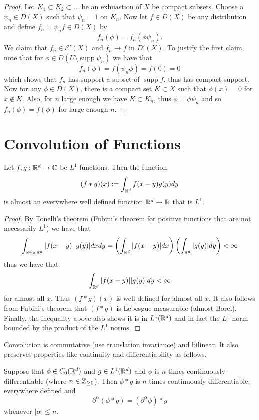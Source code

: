 \documentclass[twoside, a4paper, 10pt]{amsart}
\begin{document}
\begin{proof} Let $K_1 \subset K_2 \subset \ldots $ be an exhuastion of $X$ be compact subsets. Choose a $\psi_n \in D(X)$ such that $\psi_n = 1$ on $K_n$. Now let $f \in D(X)$ be any distribution and define $f_n = \psi_n f \in D(X)$ by $$f_n(\phi) = f_n(\phi \psi_n).$$ We claim that $f_n \in \mathcal{E}'(X)$ and $f_n \to f$ in $D'(X)$. To justify the first claim, note that for $\phi \in D(U \setminus \operatorname{supp} \psi_n)$ we have that $$f_n(\phi) = f(\psi_n \phi) = f(0) = 0$$ which shows that $f_n$ has support a subset of $\operatorname{supp} f$, thus has compact support. Now for any $\phi \in D(X)$, there is a compact set $K \subset X$ such that $\phi(x) = 0$ for $x \notin K$. Also, for $n$ large enough we have $K \subset K_n$, thus $\phi = \phi \psi_n$ and so $f_n(\phi) = f(\phi)$ for large enough $n$. \end{proof}

\section{Convolution of Functions}

\begin{prop} Let $f,g:\mathbb{R}^d \to \mathbb{C}$ be $L^1$ functions. Then the function $$(f * g) (x) := \int_{\mathbb{R}^d} f(x-y)g(y) dy$$ is almost an everywhere well defined function $\mathbb{R}^d \to \mathbb{R}$ that is $L^1$.

\end{prop}

\begin{proof} By Tonelli's theorem (Fubini's theorem for positive functions that are not necessarily $L^1$) we have that $$\int_{\mathbb{R}^d \times \mathbb{R}^d} |f(x-y)||g(y)|dx dy = \left(\int_{\mathbb{R}^d} |f(x-y)| dx \right) \left( \int_{\mathbb{R}^d} |g(y)| dy \right) < \infty$$ thus we have that $$\int_{\mathbb{R}^d} |f(x-y)||g(y)| dy < \infty$$ for almost all $x$. Thus $(f*g)(x)$ is well defined for almost all $x$. It also follows from Fubini's theorem that $(f*g)$ is Lebesgue measurable (almost Borel). Finally, the inequality above also shows it is in $L^1(\mathbb{R}^d)$ and in fact the $L^1$ norm bounded by the product of the $L^1$ norms. \end{proof}

Convolution is commutative (use translation invariance) and bilinear. It also preserves properties like continuity and differentiability as follows.

\begin{prop} Suppose that $\phi \in C_0(\mathbb{R}^d)$ and $ g \in L^1(\mathbb{R}^d)$ and $\phi$ is $n$ times continuously differentiable (where $n \in \mathbb{Z}_{\geq 0}$). Then $\phi*g$ is $n$ times continuously differentiable, everywhere defined and $$\partial^{\alpha} (\phi * g) = (\partial^{\alpha} \phi) * g$$ whenever $|\alpha|\leq n$.

\end{prop}
\end{document}
